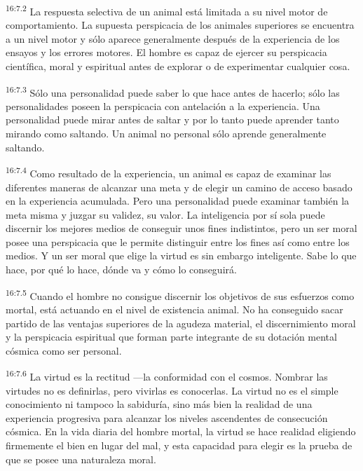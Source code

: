 \par
\textsuperscript{16:7.2} La respuesta selectiva de un animal está limitada a su nivel motor de comportamiento. La supuesta perspicacia de los animales superiores se encuentra a un nivel motor y sólo aparece generalmente después de la experiencia de los ensayos y los errores motores. El hombre es capaz de ejercer su perspicacia científica, moral y espiritual antes de explorar o de experimentar cualquier cosa.

\par
\textsuperscript{16:7.3} Sólo una personalidad puede saber lo que hace antes de hacerlo; sólo las personalidades poseen la perspicacia con antelación a la experiencia. Una personalidad puede mirar antes de saltar y por lo tanto puede aprender tanto mirando como saltando. Un animal no personal sólo aprende generalmente saltando.

\par
\textsuperscript{16:7.4} Como resultado de la experiencia, un animal es capaz de examinar las diferentes maneras de alcanzar una meta y de elegir un camino de acceso basado en la experiencia acumulada. Pero una personalidad puede examinar también la meta misma y juzgar su validez, su valor. La inteligencia por sí sola puede discernir los mejores medios de conseguir unos fines indistintos, pero un ser moral posee una perspicacia que le permite distinguir entre los fines así como entre los medios. Y un ser moral que elige la virtud es sin embargo inteligente. Sabe lo que hace, por qué lo hace, dónde va y cómo lo conseguirá.

\par
\textsuperscript{16:7.5} Cuando el hombre no consigue discernir los objetivos de sus esfuerzos como mortal, está actuando en el nivel de existencia animal. No ha conseguido sacar partido de las ventajas superiores de la agudeza material, el discernimiento moral y la perspicacia espiritual que forman parte integrante de su dotación mental cósmica como ser personal.

\par
\textsuperscript{16:7.6} La virtud es la rectitud ---la conformidad con el cosmos. Nombrar las virtudes no es definirlas, pero vivirlas es conocerlas. La virtud no es el simple conocimiento ni tampoco la sabiduría, sino más bien la realidad de una experiencia progresiva para alcanzar los niveles ascendentes de consecución cósmica. En la vida diaria del hombre mortal, la virtud se hace realidad eligiendo firmemente el bien en lugar del mal, y esta capacidad para elegir es la prueba de que se posee una naturaleza moral.

